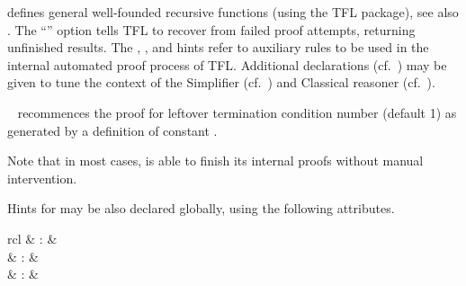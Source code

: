 \begin{isabellebody}
\begin{isamarkuptext}
  \begin{description}
  
  \item \hyperlink{command.HOL.recdef}{\mbox{}} defines general well-founded
  recursive functions (using the TFL package), see also
  \cite{isabelle-HOL}.  The ``'' option tells
  TFL to recover from failed proof attempts, returning unfinished
  results.  The , , and  hints refer to auxiliary rules to be used in the internal
  automated proof process of TFL.  Additional \hyperlink{syntax.clasimpmod}{\mbox{}}
  declarations (cf.\ ) may be given to tune the
  context of the Simplifier (cf.\ ) and
  Classical reasoner (cf.\ ).
  
  \item \hyperlink{command.HOL.recdef-tc}{\mbox{}}~ recommences the
  proof for leftover termination condition number  (default
  1) as generated by a \hyperlink{command.HOL.recdef}{\mbox{}} definition of
  constant .
  
  Note that in most cases, \hyperlink{command.HOL.recdef}{\mbox{}} is able to finish
  its internal proofs without manual intervention.

  \end{description}

  \medskip Hints for \hyperlink{command.HOL.recdef}{\mbox{}} may be also declared
  globally, using the following attributes.

  \begin{matharray}{rcl}
    \hypertarget{attribute.HOL.recdef-simp}{\hyperlink{attribute.HOL.recdef-simp}{\mbox{}}} & : &  \\
    \hypertarget{attribute.HOL.recdef-cong}{\hyperlink{attribute.HOL.recdef-cong}{\mbox{}}} & : &  \\
    \hypertarget{attribute.HOL.recdef-wf}{\hyperlink{attribute.HOL.recdef-wf}{\mbox{}}} & : &  \\
  \end{matharray}


\end{isamarkuptext}
\end{isabellebody}
